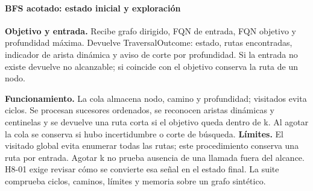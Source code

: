 \paragraph*{BFS acotado: estado inicial y exploración}
\textbf{Objetivo y entrada.} Recibe grafo dirigido, FQN de entrada, FQN objetivo y profundidad máxima. Devuelve TraversalOutcome: estado, rutas encontradas, indicador de arista dinámica y aviso de corte por profundidad. Si la entrada no existe devuelve no alcanzable; si coincide con el objetivo conserva la ruta de un nodo.
\par\begingroup{}

\endgroup
{}
\textbf{Funcionamiento.} La cola almacena nodo, camino y profundidad; visitados evita ciclos. Se procesan sucesores ordenados, se reconocen aristas dinámicas y centinelas y se devuelve una ruta corta si el objetivo queda dentro de k. Al agotar la cola se conserva si hubo incertidumbre o corte de búsqueda. \textbf{Límites.} El visitado global evita enumerar todas las rutas; este procedimiento conserva una ruta por entrada. Agotar k no prueba ausencia de una llamada fuera del alcance. H8-01 exige revisar cómo se convierte esa señal en el estado final. La suite comprueba ciclos, caminos, límites y memoria sobre un grafo sintético.
